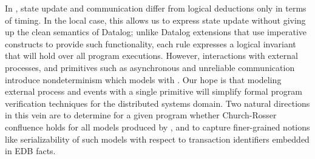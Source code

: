 
In \lang, state update and communication differ from logical
deductions only in terms of timing.
In the local case, this allows us to express state update without giving up the clean semantics of Datalog; unlike
Datalog extensions that use imperative constructs to provide such
functionality, each \lang rule expresses a logical invariant that will
hold over all program executions.  
However, interactions with external processes, and primitives such as
asynchronous and unreliable communication introduce nondeterminism
which \lang models with .  
Our hope is that modeling external process and events with a single
primitive will simplify formal program verification techniques for the distributed systems domain.  Two natural directions in this vein are to determine for a given \lang program whether Church-Rosser confluence holds for all models produced by , and to capture finer-grained notions like serializability of such models with respect to transaction identifiers embedded in EDB facts.  
% 
% 




